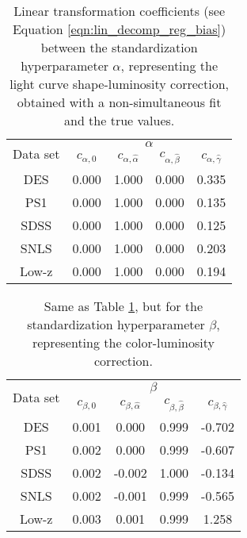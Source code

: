 \begin{table}[htbp]
\centering
    \begin{tabular}{ccccc}\toprule
    \multirow{2}{*}{Data set} &
    \multicolumn{4}{c}{$\alpha$}\\
       {}  &  $c_{\alpha, 0}$ & $c_{\alpha,\hat{\alpha}}$ & $c_{\alpha,\hat{\beta}}$ & $c_{\alpha,\hat{\gamma}}$\\\midrule
        DES
        & 0.000 & 1.000 & 0.000 & 0.335
        \\
        PS1
        & 0.000 & 1.000 & 0.000 & 0.135
        \\
        SDSS
        & 0.000 & 1.000 & 0.000 & 0.125
        \\
        SNLS
        & 0.000 & 1.000 & 0.000 & 0.203
        \\
        Low-z
        & 0.000 & 1.000 & 0.000 & 0.194
        \\\bottomrule
    \end{tabular}
    \caption{Linear transformation coefficients (see Equation \ref{eqn:lin_decomp_reg_bias}) between the standardization hyperparameter $\alpha$, representing the light curve shape-luminosity correction, obtained with a non-simultaneous fit and the true values.}
    \label{tab:trans_alpha}
\end{table}

\begin{table}[htbp]
    \centering
    \begin{tabular}{ccccc}\toprule
        \multirow{2}{*}{Data set} &
        \multicolumn{4}{c}{$\beta$}\\
        {} &  $c_{\beta, 0}$ &  $c_{\beta,\hat{\alpha}}$ & $c_{\beta,\hat{\beta}}$ & $c_{\beta,\hat{\gamma}}$\\\midrule
        DES & 0.001 & 0.000 & 0.999 & -0.702\\
        PS1 & 0.002 & 0.000 & 0.999 & -0.607\\
        SDSS & 0.002 & -0.002 & 1.000 & -0.134\\
        SNLS & 0.002 & -0.001 & 0.999 & -0.565\\
        Low-z & 0.003 & 0.001 & 0.999 & 1.258\\
    \bottomrule
    \end{tabular}
    \caption{Same as Table \ref{tab:trans_alpha}, but for the standardization hyperparameter $\beta$, representing the color-luminosity correction.}
    \label{tab:trans_beta}
\end{table}

